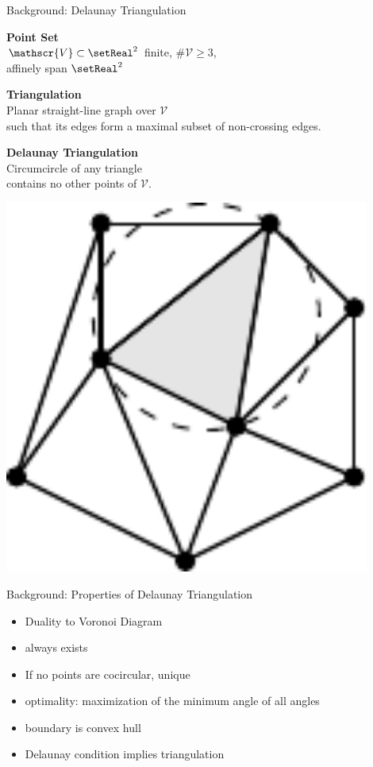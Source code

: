 \documentclass[aspectratio=169]{beamer}
\begin{document}
\begin{frame}{Background: Delaunay Triangulation}
  \begin{minipage}[c]{0.45\textwidth}
    \textbf{Point Set}\\
    $\mathscr{V}\subset\setReal^2$ finite, $\#\mathscr{V}\geq 3$, \\
    affinely span $\setReal^2$

    \bigskip

    \textbf{Triangulation}\\
    Planar straight-line graph over $\mathscr{V}$ \\
    such that its edges form a maximal subset of non-crossing edges.

    \bigskip

    \textbf{Delaunay Triangulation}\\
    Circumcircle of any triangle \\
    contains no other points of $\mathscr{V}$.
  \end{minipage}
  \hfill
  \begin{minipage}[c]{0.49\textwidth}
    \includegraphics[width=0.9\textwidth]{figures/delaunay-triangulation-circumcircle.pdf}
  \end{minipage}
\end{frame}

\begin{frame}{Background: Properties of Delaunay Triangulation}
  \begin{itemize}
    \item Duality to Voronoi Diagram
    \item always exists
    \item If no points are cocircular, unique
    \item optimality: maximization of the minimum angle of all angles
    \item boundary is convex hull
    \item Delaunay condition implies triangulation
  \end{itemize}
\end{frame}
\end{document}
